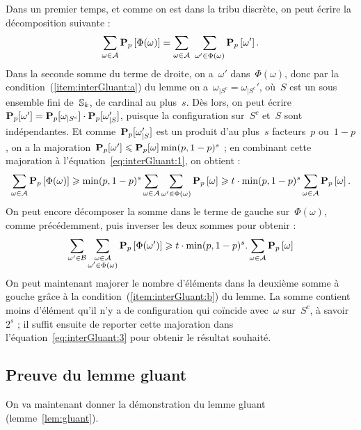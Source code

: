 		\begin{dem}
			Dans un premier temps, et comme on est dans la tribu discrète, on peut écrire la décomposition suivante :
			\begin{equation}\label{eq:interGluant:1}
				\sum_{\omega\in\mathcal{A}}\Pp{\Phi(\omega)} = \sum_{\omega\in\mathcal{A}}\ \sum_{\omega'\in\Phi(\omega)}\Pp{\omega'}.
			\end{equation}
			Dans la seconde somme du terme de droite, on a~$\omega'$ dans~$\Phi(\omega)$, donc par la condition~(\ref{item:interGluant:a}) du lemme on a~$\omega_{|S^c}=\omega_{|S^c}'$, où~$S$ est un sous ensemble fini de~$\mathbb{S}_k$, de cardinal au plus~$s$. Dès lors, on peut écrire~$\bm{\mathrm{P}}_{p}{}[\omega'] = \bm{\mathrm{P}}_{p}{}[\omega_{|S^c}]\cdot\bm{\mathrm{P}}_{p}{}[\omega_{|S}']$, puisque la configuration sur~$S^c$ et~$S$ sont indépendantes. Et comme~$\bm{\mathrm{P}}_{p}{}[\omega_{|S}']$ est un produit d'au plus~$s$ facteurs~$p$ ou~$1-p$, on a la majoration~$\bm{\mathrm{P}}_{p}{}[\omega'] \leqslant \bm{\mathrm{P}}_{p}{}[\omega]\min(p,1-p)^s$ ; en combinant cette majoration à l'équation~\eqref{eq:interGluant:1}, on obtient :
			\begin{equation}\label{eq:interGluant:2}
					\sum_{\omega\in\mathcal{A}}\bm{\mathrm{P}}_{p}\left[\Phi(\omega)\right]
				\geqslant
					\min(p,1-p)^s
					\sum_{\omega\in\mathcal{A}} \sum_{\omega'\in\Phi(\omega)} 
						\bm{\mathrm{P}}_{p}\left[\omega\right]
				\geqslant
					t\cdot\min(p,1-p)^s
					\sum_{\omega\in\mathcal{A}}\bm{\mathrm{P}}_{p}\left[\omega\right].
			\end{equation}
			On peut encore décomposer la somme dans le terme de gauche sur~$\Phi(\omega)$, comme précédemment, puis inverser les deux sommes pour obtenir :
			\begin{equation}\label{eq:interGluant:3}
					\sum_{\omega'\in\mathcal{B}}
					\sum_{\substack{\omega\in\mathcal{A}\\ \omega'\in\Phi(\omega)}}\bm{\mathrm{P}}_{p}\left[\Phi(\omega')\right]
				\geqslant
					t\cdot\min(p,1-p)^s
.					\sum_{\omega\in\mathcal{A}} \bm{\mathrm{P}}_{p}\left[\omega\right]
			\end{equation}
			On peut maintenant majorer le nombre d'éléments dans la deuxième somme à gouche grâce à la condition~(\ref{item:interGluant:b}) du lemme. La somme contient moins d'élément qu'il n'y a de configuration qui coïncide avec~$\omega$ sur~$S^c$, à savoir~$2^s$ ; il suffit ensuite de reporter cette majoration dans l'équation~\ref{eq:interGluant:3} pour obtenir le résultat souhaité.
		\end{dem}
	
	\subsection{Preuve du lemme gluant}
		On va maintenant donner la démonstration du lemme gluant (lemme~\ref{lem:gluant}).
